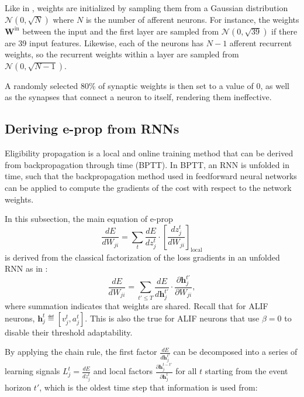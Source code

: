         Like in \citet{bellec2020solution}, weights are initialized by sampling them from a Gaussian distribution $\mathcal{N}\left(0, \sqrt{N}\right)$ where $N$ is the number of afferent neurons.
        For instance, the weights $\mathbf{W}^\text{in}$ between the input and the first layer are sampled from $\mathcal{N}\left(0, \sqrt{39}\right)$ if there are 39 input features.
        Likewise, each of the neurons has $N-1$ afferent recurrent weights, so the recurrent weights within a layer are sampled from $\mathcal{N}\left(0, \sqrt{N-1}\right)$.

        A randomly selected 80\% of synaptic weights is then set to a value of 0, as well as the synapses that connect a neuron to itself, rendering them ineffective.


    \subsection{Deriving e-prop from RNNs}\label{sec:derivefromBPTT}
        Eligibility propagation is a local and online training method that can be derived from backpropagation through time (BPTT).
        In BPTT, an RNN is unfolded in time, such that the backpropagation method used in feedforward neural networks can be applied to compute the gradients of the cost with respect to the network weights.

        In this subsection, the main equation of e-prop
        \begin{equation}
        \frac{dE}{dW_{ji}} =
        \sum_t\frac{dE}{dz_j^t}\cdot\left[\frac{dz_j^t}{dW_{ji}}\right]_\text{local}
        \end{equation}
        is derived from the classical factorization of the loss gradients in an unfolded RNN as in \citet{bellec2020solution}:
        \begin{equation}\label{eq:clafac}
        \frac{dE}{dW_{ji}} = \sum_{t' \leq T}\frac{dE}{d\mathbf{h}_j^{t'}}\cdot\frac{\partial \mathbf{h}_j^{t'}}{\partial W_{ji}},
        \end{equation}
        where summation indicates that weights are shared.
        Recall that for ALIF neurons, $\mathbf{h}^t_j \eqdef \left[v^t_j, a^t_j\right]$.
        This is also the true for ALIF neurons that use $\beta=0$ to disable their threshold adaptability.

        By applying the chain rule, the first factor $\frac{dE}{d\mathbf{h}_j^{t'}}$ can be decomposed into a series of learning signals $L_j^t = \frac{dE}{dz_j^t}$ and local factors $\frac{\partial\mathbf{h}_j^{t-t'}}{\partial\mathbf{h}_j^t}$ for all $t$ starting from the event horizon $t'$, which is the oldest time step that information is used from:

